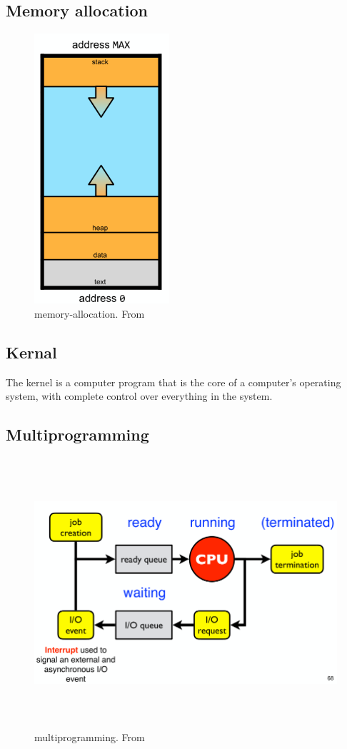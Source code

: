 \subsection{Memory allocation}
\begin{figure}[h]
    \vspace{10mm}
    \centering
    \includegraphics[width=5cm, height=10cm]{image/memory-allocation.png}
    \caption{memory-allocation. From \cite{}}
\end{figure}

\subsection{Kernal}
The kernel is a computer program
that is the core of a computer’s
operating system, with complete
control over everything in the
system.

\subsection{Multiprogramming}
\begin{figure}[h]
    \vspace{10mm}
    \centering
    \includegraphics[width=14cm, height=10cm]{image/multiprogramming.png}
    \caption{multiprogramming. From \cite{}}
\end{figure}


